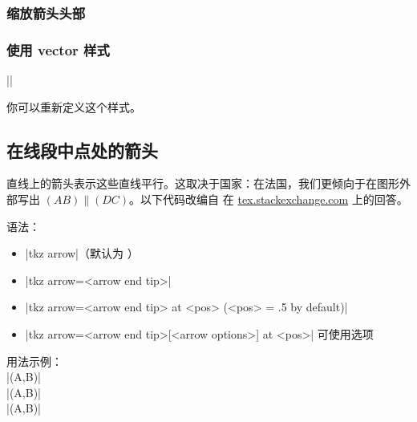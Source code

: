 \subsubsection{缩放箭头头部}

\begin{tkzexample}[latex=6cm,small]
\end{tkzexample}

\subsubsection{使用 vector 样式}
||

你可以重新定义这个样式。
\begin{tkzexample}[latex=6cm,small]
\end{tkzexample}
  
\subsection{在线段中点处的箭头}

直线上的箭头表示这些直线平行。这取决于国家：在法国，我们更倾向于在图形外部写出 $(AB) \parallel (DC)$。以下代码改编自  在 \href{https://tex.stackexchange.com/questions/632596/how-to-manage-argument-pattern-keys-and-subways}{tex.stackexchange.com} 上的回答。

\medskip
 语法：\\

 \begin{itemize}
\item |tkz arrow|（默认为 ）
\item |tkz arrow=<arrow end tip>|
\item |tkz arrow=<arrow end tip> at <pos> (<pos> = .5 by default)|
\item |tkz arrow={<arrow end tip>[<arrow options>] at <pos>}| 可使用选项 
 \end{itemize}

用法示例：\\

|\tkzDrawSegment[tkz arrow=Stealth] (A,B)|\\
|\tkzDrawSegment[tkz arrow={To[scale=3] at .4}](A,B)|\\
|\tkzDrawSegment[tkz arrow={Latex[scale=5,blue] at .6}](A,B)|

